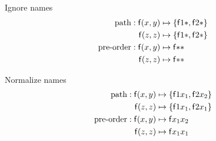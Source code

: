 

	
	\begin{block}{Ignore names}
		\vspace{-1em}
	\begin{align*}
		\text{path}: {\mathsf f}(x,y)  &\mapsto \{ {\mathsf f} 1 {*}, {\mathsf f} 2 {*} \}
		\\
		{\mathsf f}(z,z)  &\mapsto \{ {\mathsf f} 1 {*}, {\mathsf f} 2 {*} \}
		\\
		\text{pre-order}:
		{\mathsf f}(x,y) &\mapsto {\mathsf f} {*} {*}
		\\
		{\mathsf f}(z,z) &\mapsto {\mathsf f} {*} {*}
			\end{align*}
			\end{block}
%	

\begin{block}{Normalize names}
	\vspace{-1em}	
	\begin{align*}
		\text{path}: {\mathsf f}(x,y)  &\mapsto \{ {\mathsf f} 1 {x_1}, {\mathsf f} 2 {x_2}  \}
		\\
		{\mathsf f}(z,z)  &\mapsto \{ {\mathsf f} 1 {x_1}, {\mathsf f} 2 {x_1} \}
		\\
		\text{pre-order}:
		{\mathsf f}(x,y) &\mapsto {\mathsf f} {x_1} {x_2}
		\\
		{\mathsf f}(z,z) &\mapsto {\mathsf f} {x_1} {x_1}
	\end{align*}
	\end{block}